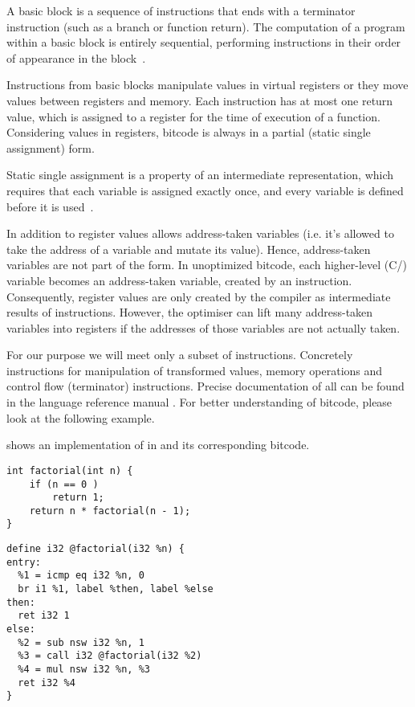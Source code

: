 \begin{definition}\label{def:basicblock}
A basic block is a sequence of instructions that ends with a terminator
instruction (such as a branch or function return). The computation of a program
within a basic block is entirely sequential, performing instructions in their
order of appearance in the block~\cite{Rockai15}.
\end{definition}

Instructions from basic blocks manipulate values in virtual registers or
they move values between registers and memory. Each instruction has at most one
return value, which is assigned to a register for the time of execution of a
function. Considering values in registers, \LLVM bitcode is always in a
partial \SSA (static single assignment) form.

\begin{definition}\label{def:ssa}
Static single assignment is a property of an intermediate representation, which
requires that each variable is assigned exactly once, and every variable is
defined before it is used~\cite{Cytron91}.
\end{definition}

In addition to register values \LLVMIR allows address-taken variables (i.e. it's
allowed to take the address of a variable and mutate its value).
Hence, address-taken variables are not part of the \SSA form. In unoptimized
\LLVM bitcode, each higher-level (C/\Cpp{}) variable becomes an address-taken
variable, created by an  instruction. Consequently, register values are only
created by the compiler as intermediate results of instructions. However, the \LLVM
optimiser can lift many address-taken variables into registers if the addresses
of those variables are not actually taken.

For our purpose we will meet only a subset of \LLVM instructions. Concretely
instructions for manipulation of transformed values, memory operations and
control flow (terminator) instructions. Precise documentation of all can be
found in the \LLVM language reference manual \cite{LLVM:langref}. For better
understanding of \LLVM bitcode, please look at the following example.

\begin{example} \label{ex:factorial}
shows an implementation of  in \Cpp{} and its corresponding \LLVM bitcode.

\begin{verbatim}
int factorial(int n) {
    if (n == 0 )
        return 1;
    return n * factorial(n - 1);
}
\end{verbatim}

\begin{verbatim}
define i32 @factorial(i32 %n) {
entry:
  %1 = icmp eq i32 %n, 0
  br i1 %1, label %then, label %else
then:
  ret i32 1
else:
  %2 = sub nsw i32 %n, 1
  %3 = call i32 @factorial(i32 %2)
  %4 = mul nsw i32 %n, %3
  ret i32 %4
}
\end{verbatim}
\end{example}

